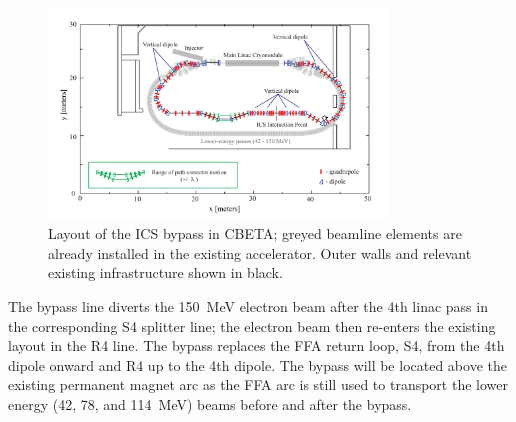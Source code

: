\documentclass[../main.tex]{subfiles}
\begin{document}

\begin{figure}[!h]
\centering
\includegraphics[width=0.8\textwidth]{Figures/CBETA_Inverse_Compton_Source_Design/cbetaicslayout.pdf}
\caption{Layout of the ICS bypass in CBETA; greyed beamline elements are already installed in the existing accelerator. Outer walls and relevant existing infrastructure shown in black.}
\label{fig:CBETA_ICS_Layout}
\end{figure}

The bypass line diverts the 150~\si{\mega\electronvolt} electron beam after the 4th linac pass in the corresponding S4 splitter line; the electron beam then re-enters the existing layout in the R4 line. The bypass replaces the FFA return loop, S4, from the 4th dipole onward and R4 up to the 4th dipole. The bypass will be located above the existing permanent magnet arc as the FFA arc is still used to transport the lower energy (42, 78, and 114~MeV) beams before and after the bypass.
\end{document}
